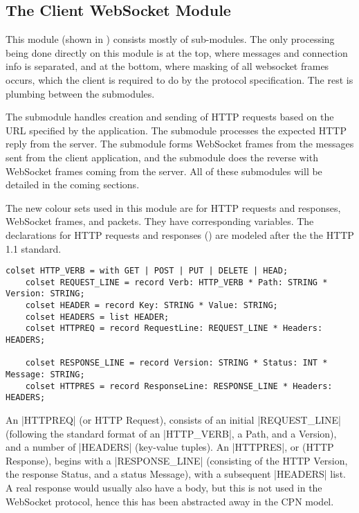 \subsection{The Client WebSocket Module}\label{sec:client_ws}


	This module (shown in ) consists mostly of sub-modules.
	The only processing being done directly on this module is at the top, where
	messages and connection info is separated, and at the bottom, where
	masking of all websocket frames occurs, which the client is required to do by
	the protocol specification. The rest is plumbing between the submodules. 
	
	The  submodule handles creation and sending of
	HTTP requests based on the URL specified by the application. The 
	 submodule processes the expected HTTP reply from
	the server. The  submodule forms WebSocket frames from
	the messages sent from the client application, and the  submodule does the reverse with WebSocket frames coming from the
	server. All of these submodules will be detailed in the coming sections.
	
	The new colour sets used in this module are for HTTP requests and responses,
	WebSocket frames, and packets. They have corresponding variables. The
	declarations for HTTP requests and responses ()
	are modeled after the  the HTTP 1.1 standard.
	
	\begin{lstlisting}[label=lst:client_lib_colset_http,caption=HTTP colour
	sets,gobble=1,float=h]
	colset HTTP_VERB = with GET | POST | PUT | DELETE | HEAD;
	colset REQUEST_LINE = record Verb: HTTP_VERB * Path: STRING * Version: STRING;
	colset HEADER = record Key: STRING * Value: STRING;
	colset HEADERS = list HEADER;
	colset HTTPREQ = record RequestLine: REQUEST_LINE *	Headers: HEADERS;
	
	colset RESPONSE_LINE = record Version: STRING * Status: INT * Message: STRING;
	colset HTTPRES = record ResponseLine: RESPONSE_LINE * Headers: HEADERS;
	\end{lstlisting}
	 
	An |HTTPREQ| (or HTTP Request),	consists of an initial |REQUEST_LINE|
	(following the standard format of an |HTTP_VERB|, a Path, and a Version), and
	a number of |HEADERS| (key-value tuples). An |HTTPRES|, or (HTTP Response),
	begins with a |RESPONSE_LINE| (consisting of the HTTP Version, the response
	Status, and a status Message), with a subsequent |HEADERS| list. A real
	response would usually also have a body, but this is not used in the
	WebSocket protocol, hence this has been abstracted away in the CPN model.
	
